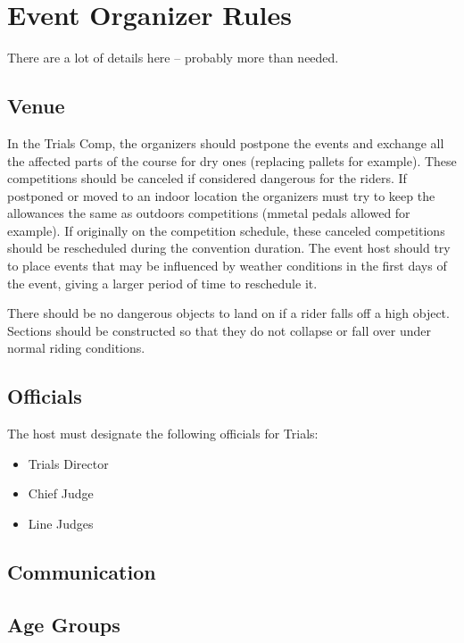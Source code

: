 \chapter{Event Organizer Rules}

\begin{comment2016}
There are a lot of details here -- probably more than needed.
\end{comment2016}

\section{Venue}

In the Trials Comp, the organizers should postpone the events and exchange all the affected parts of the course for dry ones (replacing pallets for example).
These competitions should be canceled if considered dangerous for the riders.
If postponed or moved to an indoor location the organizers must try to keep the allowances the same as outdoors competitions (mmetal pedals allowed for example).
If originally on the competition schedule, these canceled competitions should be rescheduled during the convention duration.
The event host should try to place events that may be influenced by weather conditions in the first days of the event, giving a larger period of time to reschedule it.

There should be no dangerous objects to land on if a rider falls off a high object.
Sections should be constructed so that they do not collapse or fall over under normal riding conditions.

\section{Officials}

The host must designate the following officials for Trials:
\begin{itemize}
\item Trials Director
\item Chief Judge
\item Line Judges
\end{itemize}

\section{Communication}

\section{Age Groups}

